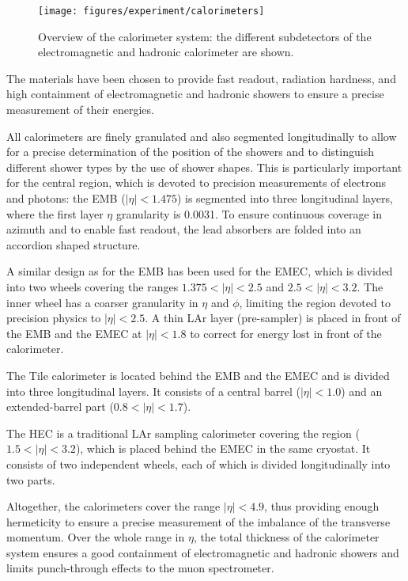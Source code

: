 \begin{figure}[h]
\begin{center}
\texttt{[image: figures/experiment/calorimeters]}
\caption[Overview of the calorimeter system]{
  Overview of the calorimeter system:
  the different subdetectors of the electromagnetic and hadronic calorimeter are shown.}
\label{fig:calorimeters}
\end{center}
\end{figure}

The materials have been chosen to provide fast readout, 
radiation hardness, and high containment of electromagnetic and
hadronic showers to ensure
a precise measurement of their energies.

All calorimeters are finely granulated and also segmented
longitudinally to allow for a precise determination of the position of the showers and to
distinguish different shower types by the use of shower shapes.
This is particularly important for the central region, 
which is devoted to precision measurements of electrons and photons:
the EMB (\mbox{$|\eta| < 1.475$}) is segmented into three longitudinal
layers, where the first layer $\eta$ granularity is 0.0031.
To ensure continuous coverage in azimuth and to enable fast readout, 
the lead absorbers are folded into an accordion shaped structure.

A similar design as for the EMB has been used for the EMEC, 
which is divided into two wheels covering the ranges \mbox{$1.375 < |\eta| < 2.5$}
and \mbox{$2.5 < |\eta| < 3.2$}.
The inner wheel has a coarser granularity in $\eta$ and $\phi$, 
limiting the region devoted to precision physics to \mbox{$|\eta| < 2.5$}.
A thin LAr layer (pre-sampler) is placed in front of the EMB and the
EMEC at \mbox{$|\eta| < 1.8$} to correct for energy lost in front of the calorimeter.

The Tile calorimeter is located behind the EMB and the EMEC and is divided into three longitudinal layers.
It consists of a central barrel (\mbox{$|\eta| < 1.0$}) and an extended-barrel part (\mbox{$0.8 < |\eta| < 1.7$}).

The HEC is a traditional LAr sampling calorimeter covering the region (\mbox{$1.5 < |\eta| < 3.2$}), which is placed behind the EMEC in the same
cryostat.
It consists of two independent wheels, each of which is divided longitudinally into two parts.

Altogether, the calorimeters cover the range \mbox{$|\eta| < 4.9$},
thus providing enough hermeticity to ensure a precise measurement
of the imbalance of the transverse momentum.
Over the whole range in $\eta$, the total thickness of the calorimeter
system ensures a good containment of
electromagnetic and hadronic showers and limits punch-through effects to the muon spectrometer.

